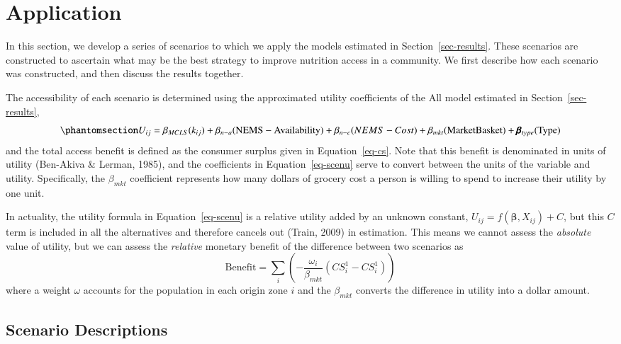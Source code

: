 \documentclass[
  letterpaper,
  number,
  review,
  3p]{elsarticle}
\begin{document}

\section{Application}\label{sec-scenarios}

In this section, we develop a series of scenarios to which we apply the
models estimated in Section~\ref{sec-results}. These scenarios are
constructed to ascertain what may be the best strategy to improve
nutrition access in a community. We first describe how each scenario was
constructed, and then discuss the results together.

The accessibility of each scenario is determined using the approximated
utility coefficients of the All model estimated in
Section~\ref{sec-results},
\begin{equation}\phantomsection\label{eq-scenu}{
U_{ij}= \beta_{MCLS}( k_{ij}) +  \beta_{n-a} (\mathrm{NEMS-Availability}) +
  \beta_{n-c}\mathrm({NEMS-Cost}) + \\ \beta_{mkt} (\mathrm{Market Basket}) + \pmb{\beta}_{type}(\mathrm{Type})  
}\end{equation} and the total access benefit is defined as the consumer
surplus given in Equation~\ref{eq-cs}. Note that this benefit is
denominated in units of utility (Ben-Akiva \& Lerman, 1985), and the
coefficients in Equation~\ref{eq-scenu} serve to convert between the
units of the variable and utility. Specifically, the \(\beta_{mkt}\)
coefficient represents how many dollars of grocery cost a person is
willing to spend to increase their utility by one unit.

In actuality, the utility formula in Equation~\ref{eq-scenu} is a
relative utility added by an unknown constant,
\(U_{ij} = f(\mathbf{\beta}, X_{ij}) + C\), but this \(C\) term is
included in all the alternatives and therefore cancels out (Train, 2009)
in estimation. This means we cannot assess the \emph{absolute} value of
utility, but we can assess the \emph{relative} monetary benefit of the
difference between two scenarios as \[
\mathrm{Benefit} = \sum_{i}\left(-\frac{\omega_i}{\beta_{mkt}}(CS_i^1 - CS_i^1)\right)
\] where a weight \(\omega\) accounts for the population in each origin
zone \(i\) and the \(\beta_{mkt}\) converts the difference in utility
into a dollar amount.

\subsection{Scenario Descriptions}\label{scenario-descriptions}
\end{document}
